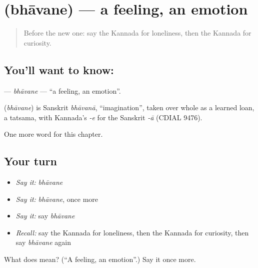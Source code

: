 \section[\texorpdfstring{\kn{ಭಾವನೆ} (bhāvane)}{ಭಾವನೆ (bhāvane)}]{ (bhāvane) — a feeling, an emotion}

\label{lesson:KA-C169-bhavane}



\begin{quote}
Before the new one: say the Kannada for loneliness, then the Kannada for curiosity.
\end{quote}

\subsection*{You'll want to know: }
\textbf{} — \emph{bhāvane} — \textquotedblleft{}a feeling, an emotion\textquotedblright{}.

\begin{cousinweb}
\textbf{} (\emph{bhāvane}) is Sanskrit \emph{bhāvanā}, \textquotedblleft{}imagination\textquotedblright{}, taken over whole as a learned loan, a tatsama, with Kannada's \emph{-e} for the Sanskrit \emph{-ā} (CDIAL 9476).
\end{cousinweb}

\begin{grammarlens}[title={What you've built}]
One more word for this chapter.
\end{grammarlens}

\subsection*{Your turn}
\begin{itemize}
\raggedright
  \item \emph{Say it:} \emph{bhāvane}
  \item \emph{Say it:} \emph{bhāvane}, once more
  \item \emph{Say it:} say \emph{bhāvane}
  \item \emph{Recall:} say the Kannada for loneliness, then the Kannada for curiosity, then say \emph{bhāvane} again
\end{itemize}

\begin{tcolorbox}[breakable,colback=teal!4,colframe=teal!35!black,title={Before you move on}]
What does  mean? (\textquotedblleft{}A feeling, an emotion\textquotedblright{}.) Say it once more.
\end{tcolorbox}
